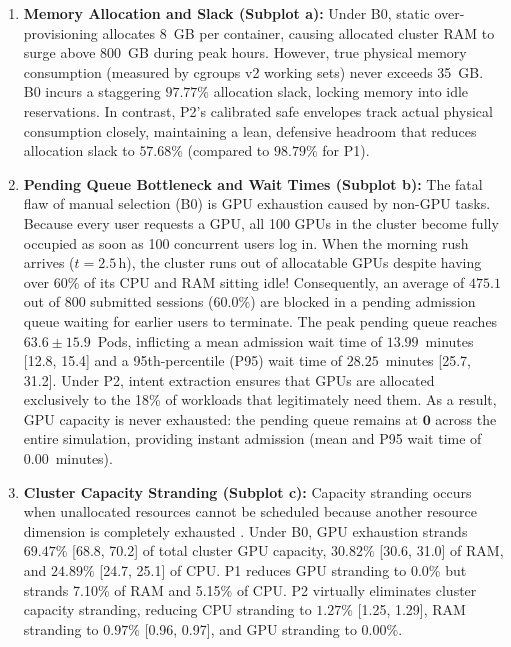 \begin{enumerate}
    \item \textbf{Memory Allocation and Slack (Subplot a):} Under B0, static over-provisioning allocates 8~GB per container, causing allocated cluster RAM to surge above 800~GB during peak hours. However, true physical memory consumption (measured by cgroups v2 working sets) never exceeds 35~GB. B0 incurs a staggering $\mathbf{97.77\%}$ allocation slack, locking memory into idle reservations. In contrast, P2's calibrated safe envelopes track actual physical consumption closely, maintaining a lean, defensive headroom that reduces allocation slack to $\mathbf{57.68\%}$ (compared to $98.79\%$ for P1).
    \item \textbf{Pending Queue Bottleneck and Wait Times (Subplot b):} The fatal flaw of manual selection (B0) is GPU exhaustion caused by non-GPU tasks. Because every user requests a GPU, all 100 GPUs in the cluster become fully occupied as soon as 100 concurrent users log in. When the morning rush arrives ($t = 2.5$\,h), the cluster runs out of allocatable GPUs despite having over 60\% of its CPU and RAM sitting idle! Consequently, an average of $\mathbf{475.1}$ out of 800 submitted sessions ($\mathbf{60.0\%}$) are blocked in a pending admission queue waiting for earlier users to terminate. The peak pending queue reaches $\mathbf{63.6 \pm 15.9}$~Pods, inflicting a mean admission wait time of $\mathbf{13.99}$~minutes [12.8, 15.4] and a 95th-percentile (P95) wait time of $\mathbf{28.25}$~minutes [25.7, 31.2]. Under P2, intent extraction ensures that GPUs are allocated exclusively to the 18\% of workloads that legitimately need them. As a result, GPU capacity is never exhausted: the pending queue remains at $\mathbf{0}$ across the entire simulation, providing instant admission (mean and P95 wait time of $\mathbf{0.00}$~minutes).
    \item \textbf{Cluster Capacity Stranding (Subplot c):} Capacity stranding occurs when unallocated resources cannot be scheduled because another resource dimension is completely exhausted \cite{k8sscheduler,autopilot}. Under B0, GPU exhaustion strands $\mathbf{69.47\%}$ [68.8, 70.2] of total cluster GPU capacity, $\mathbf{30.82\%}$ [30.6, 31.0] of RAM, and $\mathbf{24.89\%}$ [24.7, 25.1] of CPU. P1 reduces GPU stranding to 0.0\% but strands 7.10\% of RAM and 5.15\% of CPU. P2 virtually eliminates cluster capacity stranding, reducing CPU stranding to $\mathbf{1.27\%}$ [1.25, 1.29], RAM stranding to $\mathbf{0.97\%}$ [0.96, 0.97], and GPU stranding to $\mathbf{0.00\%}$.

\end{enumerate}
